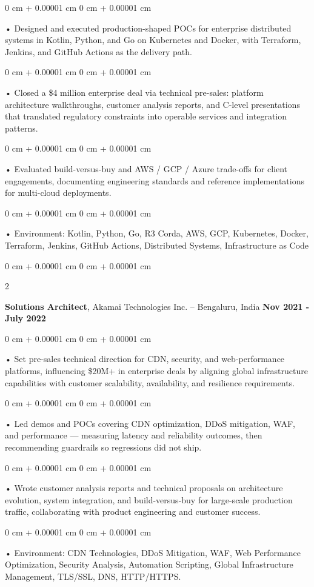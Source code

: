 \documentclass[10pt, letterpaper]{article}
\newenvironment{onecolentry}{
    \begin{adjustwidth}{
        0 cm + 0.00001 cm
    }{
        0 cm + 0.00001 cm
    }
}{
    \end{adjustwidth}
} %
\newenvironment{twocolentry}[2][]{
    \onecolentry
    \def\secondColumn{#2}
    \setcolumnwidth{\fill, 4.5 cm}
    \begin{paracol}{2}
}{
    \switchcolumn \raggedleft \secondColumn
    \end{paracol}
    \endonecolentry
} %
\begin{document}
        \begin{onecolentry}
             • Designed and executed production-shaped POCs for enterprise distributed systems in Kotlin, Python, and Go on Kubernetes and Docker, with Terraform, Jenkins, and GitHub Actions as the delivery path.
        \end{onecolentry}
        \begin{onecolentry}
             • Closed a \$4 million enterprise deal via technical pre-sales: platform architecture walkthroughs, customer analysis reports, and C-level presentations that translated regulatory constraints into operable services and integration patterns.
        \end{onecolentry}
        \begin{onecolentry}
             • Evaluated build-versus-buy and AWS / GCP / Azure trade-offs for client engagements, documenting engineering standards and reference implementations for multi-cloud deployments.
        \end{onecolentry}
        \begin{onecolentry}
             • Environment: Kotlin, Python, Go, R3 Corda, AWS, GCP, Kubernetes, Docker, Terraform, Jenkins, GitHub Actions, Distributed Systems, Infrastructure as Code
        \end{onecolentry}
        \vspace{0.1cm}

        \begin{twocolentry}{
            \textbf{Nov 2021 - July 2022}
        }
            \textbf{Solutions Architect}, Akamai Technologies Inc. -- Bengaluru, India \end{twocolentry}
        \begin{onecolentry}
            • Set pre-sales technical direction for CDN, security, and web-performance platforms, influencing \$20M+ in enterprise deals by aligning global infrastructure capabilities with customer scalability, availability, and resilience requirements.
        \end{onecolentry}
        \begin{onecolentry}
            • Led demos and POCs covering CDN optimization, DDoS mitigation, WAF, and performance --- measuring latency and reliability outcomes, then recommending guardrails so regressions did not ship.
        \end{onecolentry}
        \begin{onecolentry}
             • Wrote customer analysis reports and technical proposals on architecture evolution, system integration, and build-versus-buy for large-scale production traffic, collaborating with product engineering and customer success.
        \end{onecolentry}
        \begin{onecolentry}
             • Environment: CDN Technologies, DDoS Mitigation, WAF, Web Performance Optimization, Security Analysis, Automation Scripting, Global Infrastructure Management, TLS/SSL, DNS, HTTP/HTTPS.
        \end{onecolentry}
\end{document}
